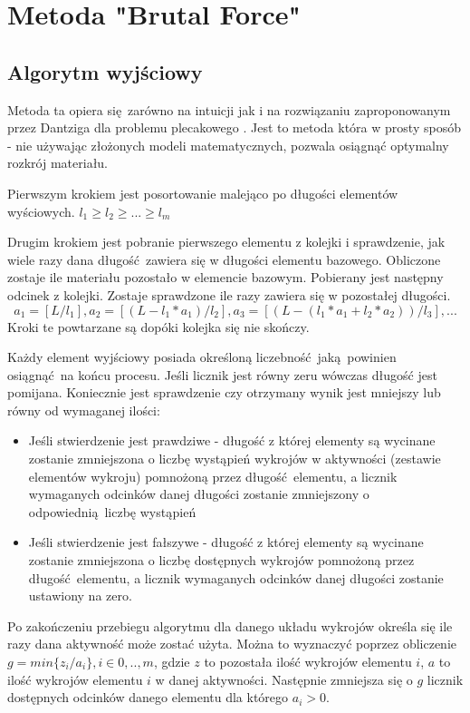 \section{Metoda "Brutal Force"}
\subsection{Algorytm wyjściowy}
Metoda ta opiera się zarówno na intuicji jak i na rozwiązaniu zaproponowanym przez Dantziga dla problemu plecakowego \cite{DantzigArticle}. Jest to metoda która w prosty sposób - nie używając złożonych modeli matematycznych, pozwala osiągnąć optymalny rozkrój materiału.

Pierwszym krokiem jest posortowanie malejąco po długości elementów wyściowych. $l_1 \ge l_2 \ge ... \ge l_m$

Drugim krokiem jest pobranie pierwszego elementu z kolejki i sprawdzenie, jak wiele razy dana długość zawiera się w długości elementu bazowego. Obliczone zostaje ile materiału pozostało w elemencie bazowym. Pobierany jest następny odcinek z kolejki. Zostaje sprawdzone ile razy zawiera się w pozostałej długości.
\begin{equation}\label{base_dantizg}
a_1 = [L/l_1], a_2 = [(L-l_1*a_1)/l_2], a_3 = [(L-(l_1*a_1+l_2*a_2))/l_3], ...
\end{equation}
Kroki te powtarzane są dopóki kolejka się nie skończy.

Każdy element wyjściowy posiada określoną liczebność jaką powinien osiągnąć na końcu procesu. Jeśli licznik jest równy zeru wówczas długość jest pomijana. Koniecznie jest sprawdzenie czy otrzymany wynik jest mniejszy lub równy od wymaganej ilości:
\begin{itemize}
  \item Jeśli stwierdzenie jest prawdziwe - długość z której elementy są wycinane zostanie zmniejszona o liczbę wystąpień wykrojów w aktywności (zestawie elementów wykroju) pomnożoną przez długość elementu, a licznik wymaganych odcinków danej długości zostanie zmniejszony o odpowiednią liczbę wystąpień
  \item Jeśli stwierdzenie jest fałszywe - długość z której elementy są wycinane zostanie zmniejszona o liczbę dostępnych wykrojów pomnożoną przez długość elementu, a licznik wymaganych odcinków danej długości zostanie ustawiony na zero.
\end{itemize}
Po zakończeniu przebiegu algorytmu dla danego układu wykrojów określa się ile razy dana aktywność może zostać użyta. Można to wyznaczyć poprzez obliczenie $g = min\{z_i/a_i\}, i \in {0,..,m}$, gdzie $z$ to pozostała ilość wykrojów elementu $i$, $a$ to ilość wykrojów elementu $i$ w danej aktywności. Następnie zmniejsza się o $g$ licznik dostępnych odcinków danego elementu dla którego $a_i > 0$.

